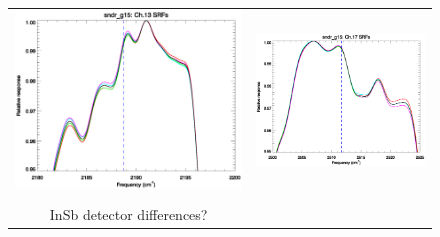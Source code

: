 \begin{figure}[htp]
\begin{tabular}{c c}
    \includegraphics[scale=0.5]{graphics/zoom_anomaly/sndr_g15.ch13.srf.eps} &
    \includegraphics[scale=0.5]{graphics/zoom_anomaly/sndr_g15.ch17.srf.eps} \\\\
    \hspace{1.0em}\textsf{InSb detector differences?} & \\

\end{tabular}
\end{figure}
